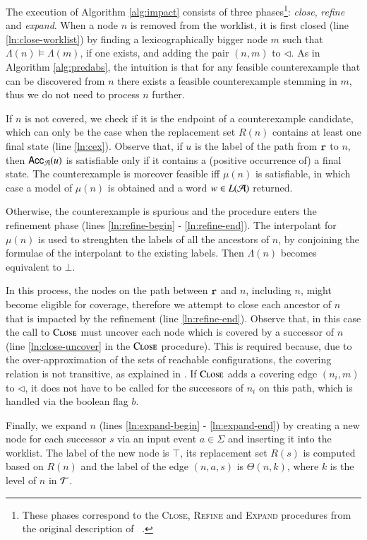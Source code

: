 \documentclass[10pt,conference,letterpaper,twocolumn]{IEEEtran}
\begin{document}
The execution of Algorithm \ref{alg:impact} consists of three
phases\footnote{These phases correspond to the \textsc{Close},
  \textsc{Refine} and \textsc{Expand} procedures from the original
  description of \impact~\cite{mcmillan06}.}: \emph{close},
\emph{refine} and \emph{expand}. When a node $n$ is removed from the
worklist, it is first closed (line \ref{ln:close-worklist}) by finding
a lexicographically bigger node $m$ such that $\Lambda(n) \models
\Lambda(m)$, if one exists, and adding the pair $(n,m)$ to $\lhd$. As
in Algorithm \ref{alg:predabs}, the intuition is that for any feasible
counterexample that can be discovered from $n$ there exists a feasible
counterexample stemming in $m$, thus we do not need to process $n$
further.

If $n$ is not covered, we check if it is the endpoint of a
counterexample candidate, which can only be the case when the
replacement set $R(n)$ contains at least one final state (line
\ref{ln:cex}). Observe that, if $u$ is the label of the path from
$\mathtt{r}$ to $n$, then $\mathsf{Acc}_{\mathcal{A}}(u)$ is satisfiable only if it
contains a (positive occurrence of) a final state. The counterexample
is moreover feasible iff $\mu(n)$ is satisfiable, in which case a
model of $\mu(n)$ is obtained and a word $w \in L(\mathcal{A})$ returned.

Otherwise, the counterexample is spurious and the procedure enters the
refinement phase (lines \ref{ln:refine-begin} -
\ref{ln:refine-end}). The interpolant for $\mu(n)$ is used to
strenghten the labels of all the ancestors of $n$, by conjoining the
formulae of the interpolant to the existing labels. Then $\Lambda(n)$
becomes equivalent to $\bot$.

In this process, the nodes on the path between $\mathtt{r}$ and $n$,
including $n$, might become eligible for coverage, therefore we
attempt to close each ancestor of $n$ that is impacted by the
refinement (line \ref{ln:refine-end}). Observe that, in this case the
call to $\Call{Close}{}$ must uncover each node which is covered by a
successor of $n$ (line \ref{ln:close-uncover} in the $\Call{Close}{}$
procedure). This is required because, due to the over-approximation of
the sets of reachable configurations, the covering relation is not
transitive, as explained in \cite{mcmillan06}. If $\Call{Close}{}$
adds a covering edge $(n_i,m)$ to $\lhd$, it does not have to be
called for the successors of $n_i$ on this path, which is handled via
the boolean flag $b$.

Finally, we expand $n$ (lines \ref{ln:expand-begin} -
\ref{ln:expand-end}) by creating a new node for each successor $s$ via
an input event $a \in \Sigma$ and inserting it into the worklist. The
label of the new node is $\top$, its replacement set $R(s)$ is
computed based on $R(n)$ and the label of the edge $(n,a,s)$ is
$\Theta(n,k)$, where $k$ is the level of $n$ in $\mathcal{T}$.
\end{document}
